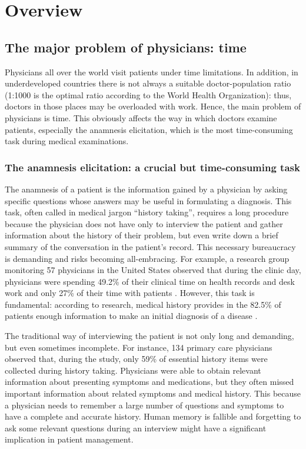 \chapter{Overview}
\label{cha:intro}

\section{The major problem of physicians: time}
\label{sec:problem_doctors}
Physicians all over the world visit patients under time limitations. In addition, in underdeveloped countries there is not always a suitable doctor-population ratio (1:1000 is the optimal ratio according to the World Health Organization)\cite{johndocument}: thus, doctors in those places may be overloaded with work. Hence, the main problem of physicians is time. This obviously affects the way in which doctors examine patients, especially the anamnesis elicitation, which is the most time-consuming task during medical examinations.

\subsection{The anamnesis elicitation: a crucial but time-consuming task}

The anamnesis of a patient is the information gained by a physician by asking specific questions whose answers may be useful in formulating a diagnosis\cite{historytakingwiki}. This task, often called in medical jargon “history taking”, requires a long procedure because the physician does not have only to interview the patient and gather information about the history of their problem, but even write down a brief summary of the conversation in the patient’s record. This necessary bureaucracy is demanding and risks becoming all-embracing. For example, a research group monitoring 57 physicians in the United States observed that during the clinic day, physicians were spending 49.2\% of their clinical time on health records and desk work and only 27\% of their time with patients \cite{sinsky}. However, this task is fundamental: according to research, medical history provides in the 82.5\% of patients enough information to make an initial diagnosis of a disease \cite{hampton1975}.

The traditional way of interviewing the patient is not only long and demanding, but even sometimes incomplete. For instance, 134 primary care physicians observed that, during the study, only 59\% of essential history items were collected during history taking. Physicians were able to obtain relevant information about presenting symptoms and medications, but they often missed important information about related symptoms and medical history. This because a physician needs to remember a large number of questions and symptoms to have a complete and accurate history. Human memory is fallible and forgetting to ask some relevant questions during an interview might have a significant implication in patient management.\cite{johndocument}

